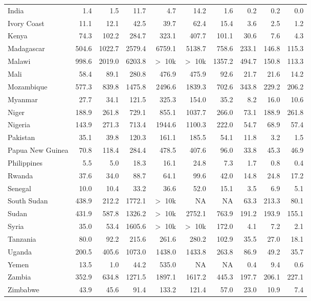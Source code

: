 \begin{table}[h]
{\begin{tabular}[t]{lrrrrrrrrr}
India & 1.4 & 1.5 & 11.7 & 4.7 & 14.2 & 1.6 & 0.2 & 0.2 & 0.0\\
Ivory Coast & 11.1 & 12.1 & 42.5 & 39.7 & 62.4 & 15.4 & 3.6 & 2.5 & 1.2\\
Kenya & 74.3 & 102.2 & 284.7 & 323.1 & 407.7 & 101.1 & 30.6 & 7.6 & 4.3\\
Madagascar & 504.6 & 1022.7 & 2579.4 & 6759.1 & 5138.7 & 758.6 & 233.1 & 146.8 & 115.3\\
Malawi & 998.6 & 2019.0 & 6203.8 & $>$ 10k & $>$ 10k & 1357.2 & 494.7 & 150.8 & 113.3\\
Mali & 58.4 & 89.1 & 280.8 & 476.9 & 475.9 & 92.6 & 21.7 & 21.6 & 14.2\\
Mozambique & 577.3 & 839.8 & 1475.8 & 2496.6 & 1839.3 & 702.6 & 343.8 & 229.2 & 206.2\\
Myanmar & 27.7 & 34.1 & 121.5 & 325.3 & 154.0 & 35.2 & 8.2 & 16.0 & 10.6\\
Niger & 188.9 & 261.8 & 729.1 & 855.1 & 1037.7 & 266.0 & 73.1 & 188.9 & 261.8\\
Nigeria & 143.9 & 271.3 & 713.4 & 1944.6 & 1100.3 & 222.0 & 54.7 & 68.9 & 57.4\\
Pakistan & 35.1 & 39.8 & 120.3 & 161.1 & 185.5 & 54.1 & 11.8 & 3.2 & 1.5\\
Papua New Guinea & 70.8 & 118.4 & 284.4 & 478.5 & 407.6 & 96.0 & 33.8 & 45.3 & 46.9\\
Philippines & 5.5 & 5.0 & 18.3 & 16.1 & 24.8 & 7.3 & 1.7 & 0.8 & 0.4\\
Rwanda & 37.6 & 34.0 & 88.7 & 64.1 & 99.6 & 42.0 & 14.8 & 24.8 & 17.2\\
Senegal & 10.0 & 10.4 & 33.2 & 36.6 & 52.0 & 15.1 & 3.5 & 6.9 & 5.1\\
South Sudan & 438.9 & 212.2 & 1772.1 & $>$ 10k & NA & NA & 63.3 & 213.3 & 80.1\\
Sudan & 431.9 & 587.8 & 1326.2 & $>$ 10k & 2752.1 & 763.9 & 191.2 & 193.9 & 155.1\\
Syria & 35.0 & 53.4 & 1605.6 & $>$ 10k & $>$ 10k & 172.0 & 4.1 & 7.2 & 2.1\\
Tanzania & 80.0 & 92.2 & 215.6 & 261.6 & 280.2 & 102.9 & 35.5 & 27.0 & 18.1\\
Uganda & 200.5 & 405.6 & 1073.0 & 1438.0 & 1433.8 & 263.8 & 86.9 & 49.2 & 35.7\\
Yemen & 13.5 & 1.0 & 44.2 & 535.0 & NA & NA & 0.4 & 9.4 & 0.6\\
Zambia & 352.9 & 634.8 & 1271.5 & 1897.1 & 1617.2 & 445.3 & 197.7 & 206.1 & 227.1\\
Zimbabwe & 43.9 & 45.6 & 91.4 & 133.2 & 121.4 & 57.0 & 23.0 & 10.9 & 7.4\\
\bottomrule
\end{tabular}}
\end{table}